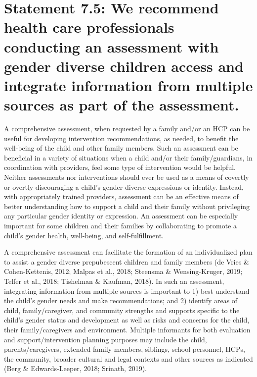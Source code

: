 \documentclass[
]{book}
\begin{document}
\hypertarget{statement-7.5-we-recommend-health-care-professionals-conducting-an-assessment-with-gender-diverse-children-access-and-integrate-information-from-multiple-sources-as-part-of-the-assessment.}{%
\section*{Statement 7.5: We recommend health care professionals conducting an assessment with gender diverse children access and integrate information from multiple sources as part of the assessment.}\label{statement-7.5-we-recommend-health-care-professionals-conducting-an-assessment-with-gender-diverse-children-access-and-integrate-information-from-multiple-sources-as-part-of-the-assessment.}}

A comprehensive assessment, when requested
by a family and/or an HCP can be useful for
developing intervention recommendations, as
needed, to benefit the well-being of the child and
other family members. Such an assessment can be
beneficial in a variety of situations when a child
and/or their family/guardians, in coordination with
providers, feel some type of intervention would
be helpful. Neither assessments nor interventions
should ever be used as a means of covertly or
overtly discouraging a child's gender diverse
expressions or identity. Instead, with appropriately
trained providers, assessment can be an effective
means of better understanding how to support a
child and their family without privileging any particular gender identity or expression. An assessment can be especially important for some children
and their families by collaborating to promote a
child's gender health, well-being, and self-fulfillment.

A comprehensive assessment can facilitate the
formation of an individualized plan to assist a
gender diverse prepubescent children and family
members (de Vries \& Cohen-Kettenis, 2012;
Malpas et al., 2018; Steensma \& Wensing-Kruger,
2019; Telfer et al., 2018; Tishelman \& Kaufman,
2018). In such an assessment, integrating information from multiple sources is important to 1)
best understand the child's gender needs and
make recommendations; and 2) identify areas of
child, family/caregiver, and community strengths
and supports specific to the child's gender status
and development as well as risks and concerns
for the child, their family/caregivers and environment. Multiple informants for both evaluation
and support/intervention planning purposes may
include the child, parents/caregivers, extended
family members, siblings, school personnel, HCPs,
the community, broader cultural and legal contexts and other sources as indicated (Berg \&
Edwards-Leeper, 2018; Srinath, 2019).
\end{document}
